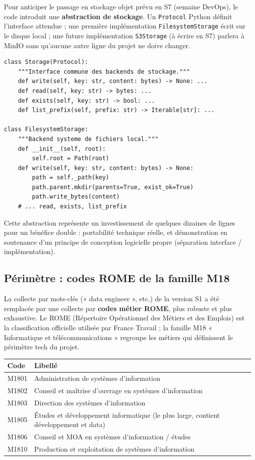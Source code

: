 \documentclass[12pt, a4paper]{article}
\begin{document}
Pour anticiper le passage en stockage objet prévu en S7 (semaine DevOps), le code introduit une \textbf{abstraction de stockage}. Un \texttt{Protocol} Python définit l'interface attendue ; une première implémentation \texttt{FilesystemStorage} écrit sur le disque local ; une future implémentation \texttt{S3Storage} (à écrire en S7) parlera à MinIO sans qu'aucune autre ligne du projet ne doive changer.

\begin{lstlisting}[style=python]
class Storage(Protocol):
    """Interface commune des backends de stockage."""
    def write(self, key: str, content: bytes) -> None: ...
    def read(self, key: str) -> bytes: ...
    def exists(self, key: str) -> bool: ...
    def list_prefix(self, prefix: str) -> Iterable[str]: ...

class FilesystemStorage:
    """Backend systeme de fichiers local."""
    def __init__(self, root):
        self.root = Path(root)
    def write(self, key: str, content: bytes) -> None:
        path = self._path(key)
        path.parent.mkdir(parents=True, exist_ok=True)
        path.write_bytes(content)
    # ... read, exists, list_prefix
\end{lstlisting}

Cette abstraction représente un investissement de quelques dizaines de lignes pour un bénéfice double : portabilité technique réelle, et démonstration en soutenance d'un principe de conception logicielle propre (séparation interface / implémentation).

\subsection{Périmètre : codes ROME de la famille M18}

La collecte par mots-clés (« data engineer », etc.) de la version S1 a été remplacée par une collecte par \textbf{codes métier ROME}, plus robuste et plus exhaustive. Le ROME (Répertoire Opérationnel des Métiers et des Emplois) est la classification officielle utilisée par France Travail ; la famille M18 « Informatique et télécommunications » regroupe les métiers qui définissent le périmètre tech du projet.

\begin{center}
\begin{tabular}{p{1.5cm} p{10cm}}
\toprule
\textbf{Code} & \textbf{Libellé} \\
\midrule
M1801 & Administration de systèmes d'information \\
M1802 & Conseil et maîtrise d'ouvrage en systèmes d'information \\
M1803 & Direction des systèmes d'information \\
M1805 & Études et développement informatique (le plus large, contient développement et data) \\
M1806 & Conseil et MOA en systèmes d'information / études \\
M1810 & Production et exploitation de systèmes d'information \\
\bottomrule
\end{tabular}
\end{center}
\end{document}
